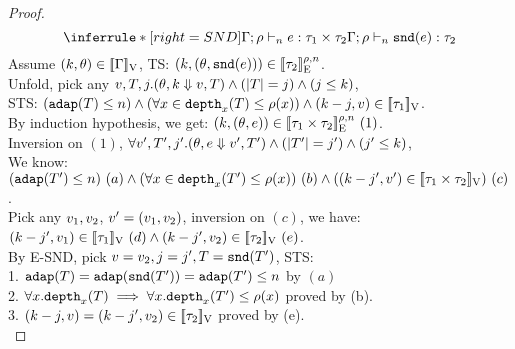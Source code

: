 \documentclass[a4paper,11pt]{article}
\theoremstyle{definition}
\begin{document}
\begin{proof}
\[
    \inferrule*[right = SND]{
      \Gamma; \dmap \tvdash{\nnatA} \expr: \type_1 \times \type_2
    }{
      \Gamma; \dmap \tvdash{\nnatA} \eprojr(\expr): \type_2
    }
\]
Assume $(k, \theta) \in [\![ \Gamma ]\!]_{\text{V}}$, TS: $(k, (\theta, \mathtt{snd}(e))) \in [\![ \tau_2 ]\!]_{\text{E}}^{\rho, n} $.\\
%
Unfold, pick any $ v, T, j. (\theta, k \mathrel{\Downarrow} v, T) \land (|T| = j) \land (j \leq k) $,\\
%
STS: $ (\mathtt{adap}(T) \leq n) \land (\forall x \in \mathtt{depth}_{x}(T) \leq \rho(x)) \land (k - j, v) \in [\![ \tau_1 ]\!]_{\text{V}} $.\\
%
By induction hypothesis, we get: $(k, (\theta, e)) \in [\![ \tau_1 \times \tau_2 ]\!]_{\text{E}}^{\rho, n} ~(1)$.\\
%
Inversion on $(1)$, $\forall v', T', j'. (\theta, e \mathrel{\Downarrow} v', T') \land (|T'| = j') \land (j' \leq k) $,\\
%
We know: $(\mathtt{adap}(T') \leq n) ~ (a) 
\land (\forall x \in \mathtt{depth}_{x}(T') \leq \rho(x)) ~ (b)
\land ((k - j', v') \in [\![ \tau_1 \times \tau_2 ]\!]_{\text{V}}) ~ (c)$.\\
%
Pick any $v_1, v_2$, $v' = (v_1, v_2)$,
%
inversion on $(c)$, we have:\\
%
$(k - j', v_1) \in [\![ \tau_1 ]\!]_{\text{V}}~(d) \land (k - j', v_2) \in [\![ \tau_2 ]\!]_{\text{V}}~(e)$.\\
%
By E-SND, pick $v = v_2, j = j', T = \mathtt{snd}(T')$, STS:\\
%
1. $\mathtt{adap}(T) = \mathtt{adap}(\mathtt{snd}(T')) = \mathtt{adap}(T') \leq n$ by $(a)$\\
%
2. $\forall x .\mathtt{depth}_{x}(T) \implies \forall x . \mathtt{depth}_{x}(T') \leq
\rho(x)$ proved by (b).\\
%
3. $(k - j, v) = (k - j', v_2) \in [\![ \tau_2 ]\!]_{\text{V}}$
proved by (e).\\



\end{proof}
\end{document}

